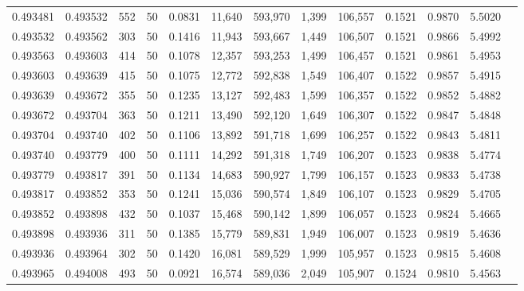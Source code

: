 \begin{tabular}{rrrrrrrrrrrrr}
0.493481 & 0.493532 & 552 &  50 &                                     0.0831 &  11,640 & 593,970 &   1,399 & 106,557 & 0.1521 & 0.9870 & 5.5020 \\
0.493532 & 0.493562 & 303 &  50 &                                     0.1416 &  11,943 & 593,667 &   1,449 & 106,507 & 0.1521 & 0.9866 & 5.4992 \\
0.493563 & 0.493603 & 414 &  50 &                                     0.1078 &  12,357 & 593,253 &   1,499 & 106,457 & 0.1521 & 0.9861 & 5.4953 \\
0.493603 & 0.493639 & 415 &  50 &                                     0.1075 &  12,772 & 592,838 &   1,549 & 106,407 & 0.1522 & 0.9857 & 5.4915 \\
0.493639 & 0.493672 & 355 &  50 &                                     0.1235 &  13,127 & 592,483 &   1,599 & 106,357 & 0.1522 & 0.9852 & 5.4882 \\
0.493672 & 0.493704 & 363 &  50 &                                     0.1211 &  13,490 & 592,120 &   1,649 & 106,307 & 0.1522 & 0.9847 & 5.4848 \\
0.493704 & 0.493740 & 402 &  50 &                                     0.1106 &  13,892 & 591,718 &   1,699 & 106,257 & 0.1522 & 0.9843 & 5.4811 \\
0.493740 & 0.493779 & 400 &  50 &                                     0.1111 &  14,292 & 591,318 &   1,749 & 106,207 & 0.1523 & 0.9838 & 5.4774 \\
0.493779 & 0.493817 & 391 &  50 &                                     0.1134 &  14,683 & 590,927 &   1,799 & 106,157 & 0.1523 & 0.9833 & 5.4738 \\
0.493817 & 0.493852 & 353 &  50 &                                     0.1241 &  15,036 & 590,574 &   1,849 & 106,107 & 0.1523 & 0.9829 & 5.4705 \\
0.493852 & 0.493898 & 432 &  50 &                                     0.1037 &  15,468 & 590,142 &   1,899 & 106,057 & 0.1523 & 0.9824 & 5.4665 \\
0.493898 & 0.493936 & 311 &  50 &                                     0.1385 &  15,779 & 589,831 &   1,949 & 106,007 & 0.1523 & 0.9819 & 5.4636 \\
0.493936 & 0.493964 & 302 &  50 &                                     0.1420 &  16,081 & 589,529 &   1,999 & 105,957 & 0.1523 & 0.9815 & 5.4608 \\
0.493965 & 0.494008 & 493 &  50 &                                     0.0921 &  16,574 & 589,036 &   2,049 & 105,907 & 0.1524 & 0.9810 & 5.4563 \\

\end{tabular}
